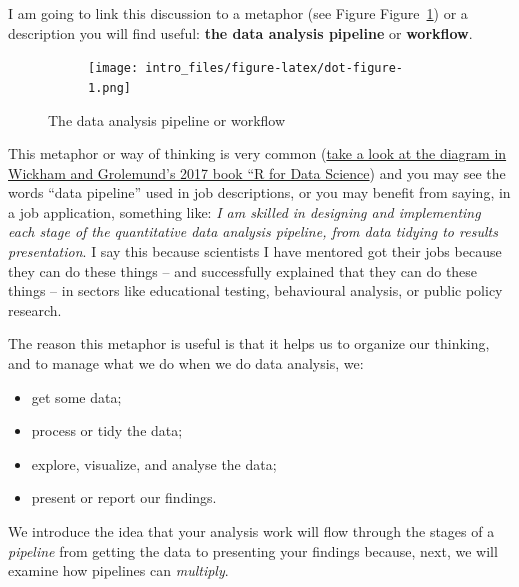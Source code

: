 \documentclass[
  letterpaper,
  DIV=11,
  numbers=noendperiod]{scrreprt}
\providecommand{\tightlist}{%
  \setlength{\itemsep}{0pt}\setlength{\parskip}{0pt}}\usepackage{longtable,booktabs,array}
\begin{document}
I am going to link this discussion to a metaphor (see Figure
Figure~\ref{fig-pipeline}) or a description you will find useful:
\textbf{the data analysis pipeline} or \textbf{workflow}.

\begin{figure}

{\centering 

\begin{figure}[H]

{\centering \texttt{[image: intro\_files/figure-latex/dot-figure-1.png]}

}

\end{figure}

}

\caption{\label{fig-pipeline}The data analysis pipeline or workflow}

\end{figure}

This metaphor or way of thinking is very common
(\href{https://r4ds.had.co.nz/introduction.html}{take a look at the
diagram in Wickham and Grolemund's 2017 book ``R for Data Science}) and
you may see the words ``data pipeline'' used in job descriptions, or you
may benefit from saying, in a job application, something like: \emph{I
am skilled in designing and implementing each stage of the quantitative
data analysis pipeline, from data tidying to results presentation}. I
say this because scientists I have mentored got their jobs because they
can do these things -- and successfully explained that they can do these
things -- in sectors like educational testing, behavioural analysis, or
public policy research.

The reason this metaphor is useful is that it helps us to organize our
thinking, and to manage what we do when we do data analysis, we:

\begin{itemize}
\tightlist
\item
  get some data;
\item
  process or tidy the data;
\item
  explore, visualize, and analyse the data;
\item
  present or report our findings.
\end{itemize}

We introduce the idea that your analysis work will flow through the
stages of a \emph{pipeline} from getting the data to presenting your
findings because, next, we will examine how pipelines can
\emph{multiply}.
\end{document}
